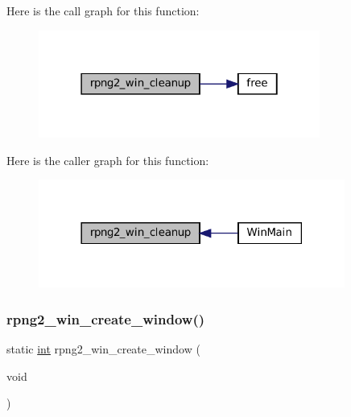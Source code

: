 Here is the call graph for this function\+:
\nopagebreak
\begin{figure}[H]
\begin{center}
\leavevmode
\includegraphics[width=262pt]{rpng2-win_8c_aa857074cb78142ee324e66d1b25d5234_cgraph}
\end{center}
\end{figure}
Here is the caller graph for this function\+:
\nopagebreak
\begin{figure}[H]
\begin{center}
\leavevmode
\includegraphics[width=285pt]{rpng2-win_8c_aa857074cb78142ee324e66d1b25d5234_icgraph}
\end{center}
\end{figure}
\mbox{\label{rpng2-win_8c_a9316682fba34635203c7fe44a4a41103}} 
\subsubsection{\texorpdfstring{rpng2\+\_\+win\+\_\+create\+\_\+window()}{rpng2\_win\_create\_window()}}
{\footnotesize\ttfamily static \mbox{\hyperlink{ioapi_8h_a787fa3cf048117ba7123753c1e74fcd6}{int}} rpng2\+\_\+win\+\_\+create\+\_\+window (\begin{DoxyParamCaption}\item[{void}]{ }\end{DoxyParamCaption})\hspace{0.3cm}{\ttfamily [static]}}

